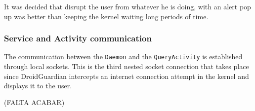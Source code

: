 It was decided that disrupt the user from whatever he is doing, with an alert pop up was better than keeping the kernel waiting long periods of time.

\subsubsection{Service and Activity communication}

The communication between the \texttt{Daemon} and the \texttt{QueryActivity} is established through local sockets. This is the third nested socket connection that takes place since DroidGuardian intercepts an internet connection attempt in the kernel and displays it to the user.

(FALTA ACABAR) 